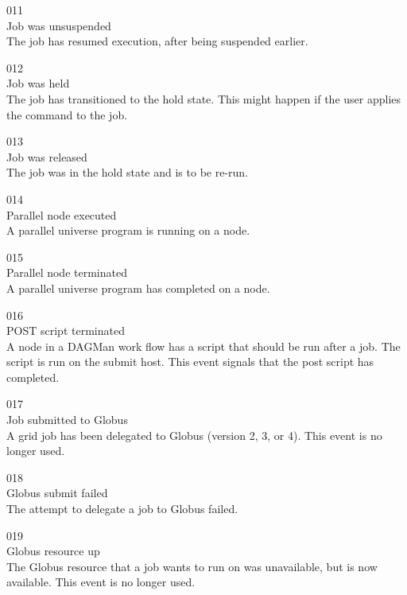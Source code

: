 \noindent{} 011 \\
 Job was unsuspended \\
 The job has resumed execution, after being
suspended earlier. 

\noindent{} 012 \\
 Job was held \\
 The job has transitioned to the hold state.
This might happen if the user applies the  command to the job.

\noindent{} 013 \\
 Job was released \\
 The job was in the hold state and is to be re-run.

\noindent{} 014 \\
 Parallel node executed \\
 A parallel universe program is running on a node.

\noindent{} 015 \\
 Parallel node terminated \\
 A parallel universe program has completed on a node.

\noindent{} 016 \\
 POST script terminated \\
 A node in a DAGMan work flow has a script
that should be run after a job. 
The script is run on the submit host. 
This event signals that the post script has completed.

\noindent{} 017 \\
 Job submitted to Globus \\
 A grid job has been delegated to Globus
(version 2, 3, or 4).
This event is no longer used.

\noindent{} 018 \\
 Globus submit failed \\
 The attempt to delegate a job to Globus
failed. 

\noindent{} 019 \\
 Globus resource up \\
 The Globus resource that a job wants to run
on was unavailable, but is now available.
This event is no longer used.

